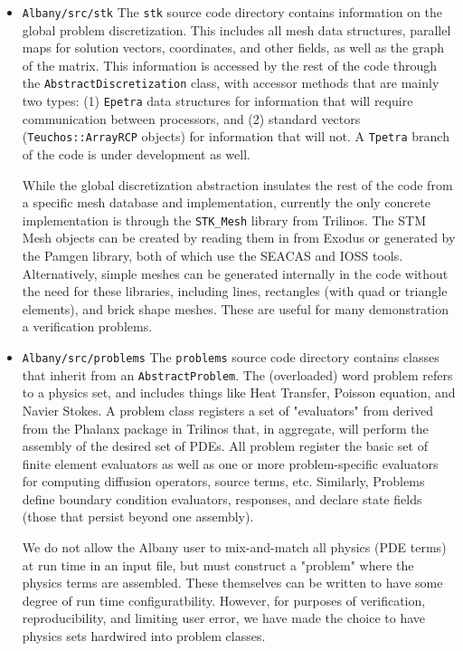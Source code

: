 \documentclass[pdf,12pt,report,strict]{SANDreport}
\theoremstyle{remark}
\begin{document}
\begin{itemize}
\item{\texttt{Albany/src/stk}}  The \texttt{stk} source code directory contains information
on the global problem discretization. This includes all mesh data structures, parallel
maps for solution vectors, coordinates, and other fields, as well as the graph of the
matrix. This information is accessed by the rest of the code through the 
\texttt{AbstractDiscretization} class, with accessor methods that are mainly 
two types: (1) \texttt{Epetra} data structures for information that will 
require communication between processors, and (2)
standard vectors (\texttt{Teuchos::ArrayRCP} objects) for information that will not.
A \texttt{Tpetra} branch of the code is under development as well.

While the global discretization abstraction insulates the rest of the code from a
specific mesh database and implementation, currently the only concrete implementation
is through the \texttt{STK\_Mesh} library from Trilinos. The STM Mesh objects can be
created by reading them in from Exodus or generated by the Pamgen library, both of
which use the SEACAS and IOSS tools. Alternatively, simple meshes can be generated
internally in the code without the need for these libraries, including lines, 
rectangles (with quad or triangle elements), and brick shape meshes. These are useful
for many demonstration a verification problems.

\item{\texttt{Albany/src/problems}}  The \texttt{problems} source code directory contains
classes that inherit from an \texttt{AbstractProblem}. The (overloaded) word problem 
refers to a physics set, and includes things like Heat Transfer, Poisson equation, and
Navier Stokes. A problem class registers a set of "evaluators" from derived from the
Phalanx package in Trilinos that, in aggregate, will perform the assembly of the desired
set of PDEs. All problem register the basic set of finite element evaluators as well as
one or more problem-specific evaluators for computing diffusion operators, source terms,
etc. Similarly, Problems define boundary condition evaluators, responses, and declare
state fields (those that persist beyond one assembly). 

We do not allow the Albany user to mix-and-match all physics (PDE terms)
at run time in an input file, but must construct a "problem" where the physics terms
are assembled. These themselves can be written to have some degree of run time configuratbility.
However, for purposes of verification, reproducibility, and limiting user error, we 
have made the choice to have physics sets hardwired into problem classes.


\end{itemize}
\end{document}
